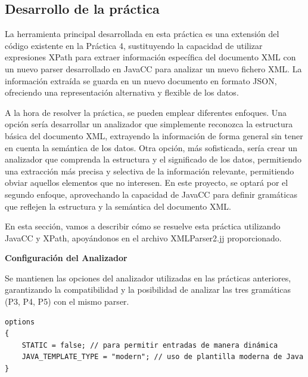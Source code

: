 
\subsection{Desarrollo de la práctica}

\noindent La herramienta principal desarrollada en esta práctica es una extensión del código existente en la Práctica 4, sustituyendo la capacidad de utilizar expresiones XPath para extraer información específica del documento XML con un nuevo parser desarrollado en JavaCC para analizar un nuevo fichero XML. La información extraída se guarda en un nuevo documento en formato JSON, ofreciendo una representación alternativa y flexible de los datos.

A la hora de resolver la práctica, se pueden emplear diferentes enfoques. Una opción sería desarrollar un analizador que simplemente reconozca la estructura básica del documento XML, extrayendo la información de forma general sin tener en cuenta la semántica de los datos. Otra opción, más sofisticada, sería crear un analizador que comprenda la estructura y el significado de los datos, permitiendo una extracción más precisa y selectiva de la información relevante, permitiendo obviar aquellos elementos que no interesen. En este proyecto, se optará por el segundo enfoque, aprovechando la capacidad de JavaCC para definir gramáticas que reflejen la estructura y la semántica del documento XML.

En esta sección, vamos a describir cómo se resuelve esta práctica utilizando JavaCC y XPath, apoyándonos en el archivo XMLParser2.jj proporcionado.

\phantom{text}

\noindent \textbf{Configuración del Analizador}

\phantom{text}

Se mantienen las opciones del analizador utilizadas en las prácticas anteriores, garantizando la compatibilidad y la posibilidad de analizar las tres gramáticas (P3, P4, P5) con el mismo parser.

\lstset{inputencoding=utf8/latin1}
\begin{lstlisting}
options
{
    STATIC = false; // para permitir entradas de manera dinámica
    JAVA_TEMPLATE_TYPE = "modern"; // uso de plantilla moderna de Java
}
\end{lstlisting}


